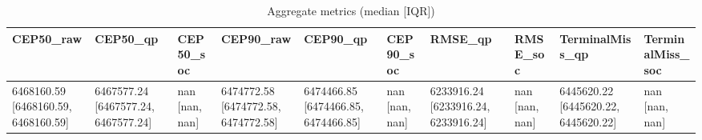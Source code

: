 \begin{table}[t]
\centering
\begin{tabular}{llllllllll}
\toprule
CEP50_raw & CEP50_qp & CEP50_soc & CEP90_raw & CEP90_qp & CEP90_soc & RMSE_qp & RMSE_soc & TerminalMiss_qp & TerminalMiss_soc \\
\midrule
6468160.59 [6468160.59, 6468160.59] & 6467577.24 [6467577.24, 6467577.24] & nan [nan, nan] & 6474772.58 [6474772.58, 6474772.58] & 6474466.85 [6474466.85, 6474466.85] & nan [nan, nan] & 6233916.24 [6233916.24, 6233916.24] & nan [nan, nan] & 6445620.22 [6445620.22, 6445620.22] & nan [nan, nan] \\
\bottomrule
\end{tabular}
\caption{Aggregate metrics (median [IQR])}
\label{tab:aggregate}
\end{table}
